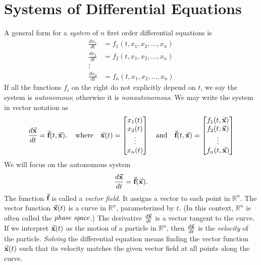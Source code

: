 \newpage

\section{Systems of Differential Equations}

A general form for a \emph{system} of $n$ first order differential
equations is
\begin{equation}
\begin{split}
  \frac{dx_1}{dt} & = f_1(t,x_1,x_2,\ldots,x_n) \\
  \frac{dx_2}{dt} & = f_2(t,x_1,x_2,\ldots,x_n) \\
  \vdots \\
  \frac{dx_n}{dt} & = f_n(t,x_1,x_2,\ldots,x_n)
\end{split}
\end{equation}
If all the functions $f_i$ on the right do not explicitly depend on
$t$, we say the system is \emph{autonomous}; otherwise it is
\emph{nonautonomous}.
We may write the system in vector notation as
\begin{equation}
   \frac{d\vec{\textbf{x}}}{dt} = \vec{\textbf{f}}(t,\vec{\textbf{x}}),
      \quad
      \textrm{where}
      \quad
      \vec{\textbf{x}}(t) = \begin{bmatrix} x_1(t) \\ x_2(t) \\ \vdots \\ x_n(t)\end{bmatrix}
      \quad
      \textrm{and}
      \quad
      \vec{\textbf{f}}(t,\vec{\textbf{x}}) = \begin{bmatrix} f_1(t,\vec{\textbf{x}}) \\ f_2(t,\vec{\textbf{x}}) \\ \vdots \\ f_n(t,\vec{\textbf{x}}) \end{bmatrix}
\end{equation}
We will focus on the autonomous system
\begin{equation}
   \frac{d\vec{\textbf{x}}}{dt} = \vec{\textbf{f}}(\vec{\textbf{x}}).
\end{equation}
The function $\vec{\textbf{f}}$ is called a \emph{vector field}.
It assigns a vector to each point in $\mathbb{R}^n$.
The vector function $\vec{\textbf{x}}(t)$ is a curve in $\mathbb{R}^n$,
parameterized by $t$.
(In this context, $\mathbb{R}^n$ is often called
the $\emph{phase space}$.)
The derivative $\frac{d\vec{\textbf{x}}}{dt}$ is a vector tangent to
the curve.
If we interpret $\vec{\textbf{x}}(t)$ as the motion of a particle
in $\mathbb{R}^n$, then $\frac{d\vec{\textbf{x}}}{dt}$ is the \emph{velocity}
of the particle.
\emph{Solving} the differential equation means finding
the vector function
$\vec{\textbf{x}}(t)$ such that its velocity matches the given vector field
at all points along the curve.

